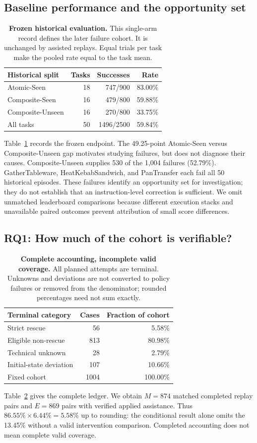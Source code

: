 \documentclass[10pt,twocolumn,letterpaper]{article}
\begin{document}
\subsection{Baseline performance and the opportunity set}
\begin{table}[t]
\centering\small
\begin{tabular}{@{}lrrr@{}}
\toprule
Historical split & Tasks & Successes & Rate\\
\midrule
Atomic-Seen &18&747/900&83.00\%\\
Composite-Seen &16&479/800&59.88\%\\
Composite-Unseen &16&270/800&33.75\%\\
\midrule
All tasks &50&1496/2500&59.84\%\\
\bottomrule
\end{tabular}
\caption{\textbf{Frozen historical evaluation.} This single-arm record defines the later failure cohort. It is unchanged by assisted replays. Equal trials per task make the pooled rate equal to the task mean.}
\label{tab:baseline}
\end{table}
Table~\ref{tab:baseline} records the frozen endpoint. The 49.25-point Atomic-Seen versus Composite-Unseen gap motivates studying failures, but does not diagnose their causes. Composite-Unseen supplies 530 of the 1,004 failures (52.79\%). GatherTableware, HeatKebabSandwich, and PanTransfer each fail all 50 historical episodes. These failures identify an opportunity set for investigation; they do not establish that an instruction-level correction is sufficient. We omit unmatched leaderboard comparisons because different execution stacks and unavailable paired outcomes prevent attribution of small score differences.

\subsection{RQ1: How much of the cohort is verifiable?}
\begin{table}[t]
\centering\small
\begin{tabular}{@{}lrr@{}}
\toprule
Terminal category & Cases & Fraction of cohort\\
\midrule
Strict rescue &56&5.58\%\\
Eligible non-rescue &813&80.98\%\\
Technical unknown &28&2.79\%\\
Initial-state deviation &107&10.66\%\\
\midrule
Fixed cohort &1004&100.00\%\\
\bottomrule
\end{tabular}
\caption{\textbf{Complete accounting, incomplete valid coverage.} All planned attempts are terminal. Unknowns and deviations are not converted to policy failures or removed from the denominator; rounded percentages need not sum exactly.}
\label{tab:coverage}
\end{table}
Table~\ref{tab:coverage} gives the complete ledger. We obtain $M=874$ matched completed replay pairs and $E=869$ pairs with verified applied assistance. Thus $86.55\%\times6.44\%=5.58\%$ up to rounding: the conditional result alone omits the 13.45\% without a valid intervention comparison. Completed accounting does not mean complete valid coverage.
\end{document}
